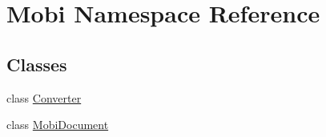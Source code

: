 \hypertarget{namespaceMobi}{\section{Mobi Namespace Reference}
\label{namespaceMobi}
}
\subsection*{Classes}
\begin{DoxyCompactItemize}
\item 
class \hyperlink{classMobi_1_1Converter}{Converter}
\item 
class \hyperlink{classMobi_1_1MobiDocument}{Mobi\+Document}
\end{DoxyCompactItemize}
